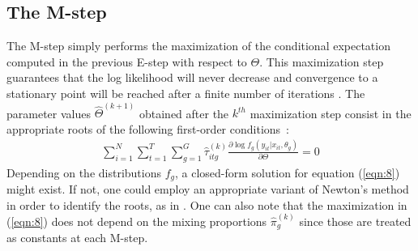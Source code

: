 \documentclass[11pt,letter]{article}
\begin{document}
\subsection{The M-step}
The M-step simply performs the maximization of the conditional expectation computed in the previous E-step with respect to $\Theta$. This maximization step guarantees that the log likelihood will never decrease and convergence to a stationary point will be reached after a finite number of iterations \citep{dempster_maximum_1977,wu_convergence_1983}. The parameter values $\hat{\Theta}^{(k+1)}$ obtained after the $k^{th}$ maximization step consist in the appropriate roots of the following first-order conditions~:
\begin{align} \label{eqn:8}
\sum_{i=1}^N \sum_{t=1}^T \sum_{g=1}^G \hat{\tau}^{(k)}_{itg} \frac{\partial \log f_g(y_{it}|x_{it},\theta_g)}{\partial\Theta} = 0
\end{align}
Depending on the distributions $f_g$, a closed-form solution for equation (\ref{eqn:8}) might exist. If not, one could employ an appropriate variant of Newton's method in order to identify the roots, as in \cite{cappe_-line_2009}. One can also note that the maximization in (\ref{eqn:8}) does not depend on the mixing proportions $\hat{\pi}^{(k)}_g$ since those are treated as constants at each M-step.
\end{document}
